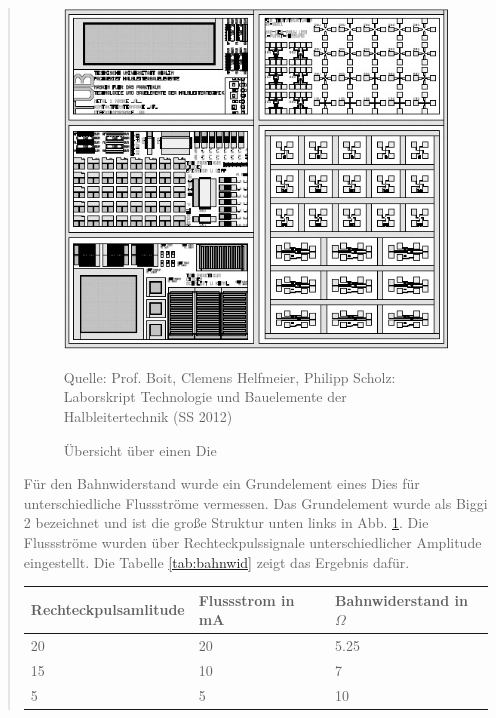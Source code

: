 \begin{quote}
	\begin{figure}[H]
        \centering
        \includegraphics[scale=0.8]{./SchaltverhaltenBilder/Die_uebersicht.jpg}
        \caption{Übersicht über einen Die}
             \begin{center}
                 \small Quelle: Prof. Boit, Clemens Helfmeier, Philipp Scholz: Laborskript Technologie und Bauelemente der Halbleitertechnik (SS 2012)
             \end{center} 
        \label{fig:Die}
    \end{figure}
	
	\vspace{2em}
	
	
	Für den Bahnwiderstand wurde ein Grundelement eines Dies für 
	unterschiedliche Flussströme vermessen. Das Grundelement wurde als Biggi 2 
	bezeichnet und ist die große Struktur unten links in Abb. \ref{fig:Die}. Die 
	Flussströme wurden über Rechteckpulssignale unterschiedlicher Amplitude 
	eingestellt. Die Tabelle \ref{tab:bahnwid} zeigt das Ergebnis dafür.\\
	
	
	\vspace{2em}

      		\begin{table}[H]
     		  \begin{addmargin}[3cm]{3cm}
     			\centering
                   \begin{tabular}{|p{3cm}|p{3cm}|p{3cm}|}
         			\hline
         			Rechteckpulsamlitude & Flussstrom in mA &  Bahnwiderstand in $\Omega$\\
         			\hline
        			20 & 20 & 5.25 \\
        			\hline
                    15 & 10 & 7    \\
                    \hline
                    5 & 5 & 10     \\
                    \hline


\end{tabular}
\end{addmargin}
\end{table}
\end{quote}
